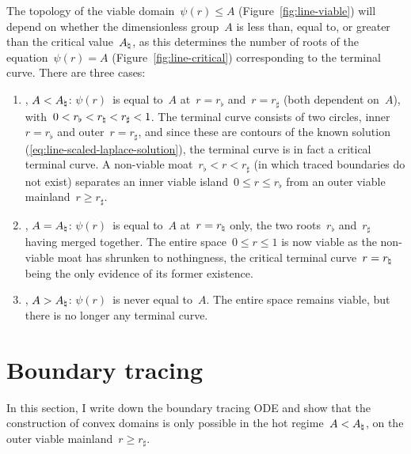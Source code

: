 The topology of the viable domain~$\psi (r) \le A$
(Figure~\ref{fig:line-viable})
will depend on whether the dimensionless group~$A$ is
less than, equal to, or greater than the critical value~$A_\natural$,
as this determines the number of roots of the equation~$\psi (r) = A$
(Figure~\ref{fig:line-critical})
corresponding to the terminal curve.
There are three cases:
\begin{enumerate}
  \item
  \label{itm:polar.regimes.hot}
    , $A < A_\natural$:
    $\psi (r)$~is equal to~$A$ at~$r = r_\flat$ and~$r = r_\sharp$
    (both dependent on~$A$),
    with~$0 <  r_\flat < r_\natural < r_\sharp < 1$.
    The terminal curve consists of two circles,
    inner~$r = r_\flat$ and outer~$r = r_\sharp$,
    and since these are contours of the known solution~%
      (\ref{eq:line-scaled-laplace-solution}),
    the terminal curve is in fact a critical terminal curve.
    A non-viable moat~$r_\flat < r < r_\sharp$
    (in which traced boundaries do not exist)
    separates an inner viable island~$0 \le r \le r_\flat$
    from an outer viable mainland~$r \ge r_\sharp$.
  \item
    , $A = A_\natural$:
    $\psi (r)$~is equal to~$A$ at~$r = r_\natural$ only,
    the two roots~$r_\flat$ and~$r_\sharp$ having merged together.
    The entire space~$0 \le r \le 1$ is now viable
    as the non-viable moat has shrunken to nothingness,
    the critical terminal curve~$r = r_\natural$
    being the only evidence of its former existence.
  \item
    , $A > A_\natural$:
    $\psi (r)$~is never equal to~$A$.
    The entire space remains viable,
    but there is no longer any terminal curve.
\end{enumerate}

\begin{figure}
\end{figure}

\section{Boundary tracing}
\label{sec:polar.tracing}

In this section, I write down the boundary tracing ODE
and show that the construction of convex domains
is only possible in the hot regime~$A < A_\natural$,
on the outer viable mainland~$r \ge r_\sharp$.

